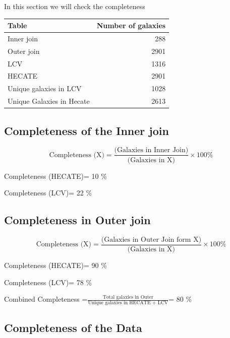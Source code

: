 \documentclass[
]{article}
\begin{document}
In this section we will check the completeness

\begin{longtable}[]{@{}lr@{}}
\toprule\noalign{}
Table & Number of galaxies \\
\midrule\noalign{}
\endhead
\bottomrule\noalign{}
\endlastfoot
Inner join & 288 \\
Outer join & 2901 \\
LCV & 1316 \\
HECATE & 2901 \\
Unique galaxies in LCV & 1028 \\
Unique Galaxies in Hecate & 2613 \\
\end{longtable}

\subsection{Completeness of the Inner
join}\label{completeness-of-the-inner-join}

\[
\text{Completeness (X)}=\frac{\text{(Galaxies in Inner Join)}}{\text{(Galaxies in X)}}×100\%
\]

Completeness (HECATE)= 10 \%

Completeness (LCV)= 22 \%

\subsection{Completeness in Outer
join}\label{completeness-in-outer-join}

\[
\text{Completeness (X)}=\frac{\text{(Galaxies in Outer Join form X)}}{\text{(Galaxies in X)}}×100\%
\]

Completeness (HECATE)= 90 \%

Completeness (LCV)= 78 \%

Combined Completeness
=\(\frac{\text{Total galaxies in Outer}}{\text{Unique galaxies in HECATE + LCV}}\)=
80 \%

\subsection{Completeness of the Data}\label{completeness-of-the-data}
\end{document}
